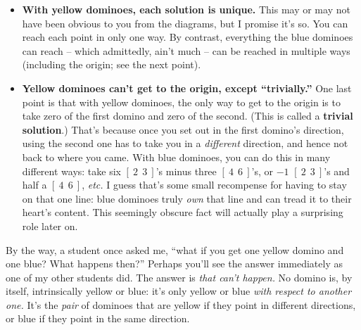 \begin{itemize}
\item \textbf{With yellow dominoes, each solution is unique.} This may or may
not have been obvious to you from the diagrams, but I promise it's so. You can
reach each point in only one way. By contrast, everything the blue dominoes can
reach -- which admittedly, ain't much -- can be reached in multiple ways
(including the origin; see the next point).


\item \textbf{Yellow dominoes can't get to the origin, except ``trivially.''}
One last point is that with yellow dominoes, the only way to get to the origin
is to take zero of the first domino and zero of the second. (This is called a
\textbf{trivial solution}.) That's because once you set out in the first
domino's direction, using the second one has to take you in a
\textit{different} direction, and hence not back to where you came. With blue
dominoes, you can do this in many different ways: take six $[\ 2\ \ 3\ ]$'s
minus three $[\ 4\ \ 6\ ]$'s, or $-1$ $[\ 2\ \ 3\ ]$'s and half a $[\ 4\ \ 6\
]$, \textit{etc.} I guess that's some small recompense for having to stay on
that one line: blue dominoes truly \textit{own} that line and can tread it to
their heart's content. This seemingly obscure fact will actually play a
surprising role later on.

\end{itemize}

By the way, a student once asked me, ``what if you get one yellow domino and
one blue? What happens then?'' Perhaps you'll see the answer immediately as one
of my other students did. The answer is \textit{that can't happen.} No domino
is, by itself, intrinsically yellow or blue: it's only yellow or blue
\textit{with respect to another one.} It's the \textit{pair} of dominoes that
are yellow if they point in different directions, or blue if they point in the
same direction.



